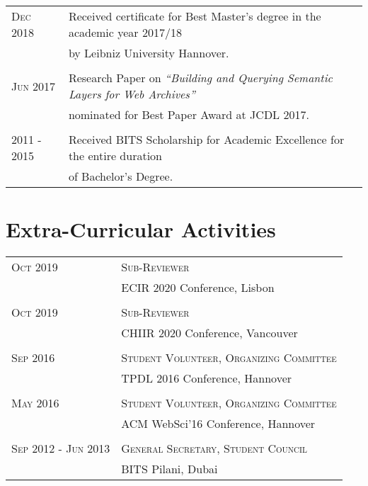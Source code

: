\documentclass[a4paper,10pt]{article} %
\begin{document}
\begin{tabular}{ll}
\textsc{Dec} 2018 & Received certificate for Best Master's degree in the academic year 2017/18\\
& by Leibniz University Hannover.\\
\\
\textsc{Jun} 2017 & Research Paper on \emph{``Building and Querying Semantic Layers for Web Archives''}\\
& nominated for Best Paper Award at JCDL 2017.\\
\\
\textsc{2011 - 2015} & Received BITS Scholarship for Academic Excellence for the entire 
duration\\
& of Bachelor’s Degree.

\end{tabular}


\section{Extra-Curricular Activities}

\begin{tabular}{ll}
\textsc{Oct 2019} & \textsc{Sub-Reviewer}\\
& ECIR 2020 Conference, Lisbon\\
\\
\textsc{Oct 2019} & \textsc{Sub-Reviewer}\\
& CHIIR 2020 Conference, Vancouver\\
\\
\textsc{Sep 2016} & \textsc{Student Volunteer, Organizing Committee}\\
& TPDL 2016 Conference, Hannover\\
\\
\textsc{May 2016} & \textsc{Student Volunteer, Organizing Committee}\\
& ACM WebSci'16 Conference, Hannover\\
\\
\textsc{Sep 2012 - Jun 2013} & \textsc{General Secretary, Student Council}\\
& BITS Pilani, Dubai\\
\end{tabular}

\end{document}
